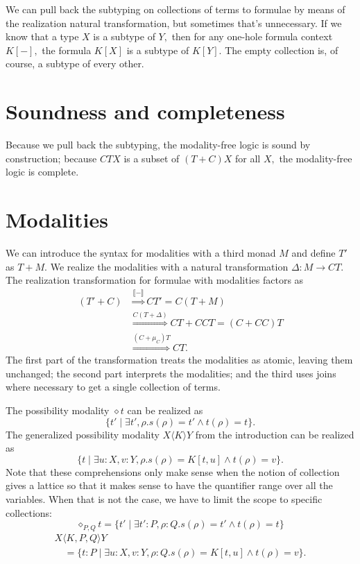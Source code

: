\documentclass[sigplan,9pt,review,anonymous]{acmart}\settopmatter{printfolios=true,printccs=false,printacmref=false}
\newcommand{\maps}{\colon}
\newcommand{\interp}[1]{\llbracket #1 \rrbracket}
\begin{document}
We can pull back the subtyping on collections of terms to formulae by means of the realization natural transformation, but sometimes that's unnecessary.  If we know that a type $X$ is a subtype of $Y,$ then for any one-hole formula context $K[-],$ the formula $K[X]$ is a subtype of $K[Y].$  The empty collection is, of course, a subtype of every other.

\section{Soundness and completeness}

Because we pull back the subtyping, the modality-free logic is sound by construction; because $CTX$ is a subset of $(T+C)X$ for all $X,$ the modality-free logic is complete.

\section{Modalities}

We can introduce the syntax for modalities with a third monad $M$ and define $T'$ as $T+M.$  We realize the modalities with a natural transformation $\Delta\maps M \to CT.$  The realization transformation for formulae with modalities factors as
\[ \begin{array}{rl}
  (T'+C) & \stackrel{\interp{-}}{\Rightarrow} CT' = C(T+M) \\
    & \stackrel{C(T+\Delta)}{\Rightarrow} CT+CCT = (C + CC)T \\
    & \stackrel{(C + \mu_C)T}{\Rightarrow} CT.
\end{array} \]
The first part of the transformation treats the modalities as atomic, leaving them unchanged; the second part interprets the modalities; and the third uses joins where necessary to get a single collection of terms.

The possibility modality $\diamond t$ can be realized as 
\[\{ t'\;|\; \exists t', \rho. s(\rho) = t' \land t(\rho) = t\}.\]  
The generalized possibility modality $X\langle K\rangle Y$ from the introduction can be realized as 
\[\{ t\;|\; \exists u:X, v:Y, \rho. s(\rho) = K[t, u] \land t(\rho) = v \}. \]
Note that these comprehensions only make sense when the notion of collection gives a lattice so that it makes sense to have the quantifier range over all the variables.  When that is not the case, we have to limit the scope to specific collections:
\[\diamond_{P,Q} t = \{ t'\;|\; \exists t':P, \rho:Q. s(\rho) = t' \land t(\rho) = t\}\]
\[\begin{array}{l}
  X\langle K,P,Q\rangle Y \\
  \quad = \{ t:P\;|\; \exists u:X, v:Y, \rho:Q. s(\rho) = K[t, u] \land t(\rho) = v \}.
\end{array} \]
\end{document}
